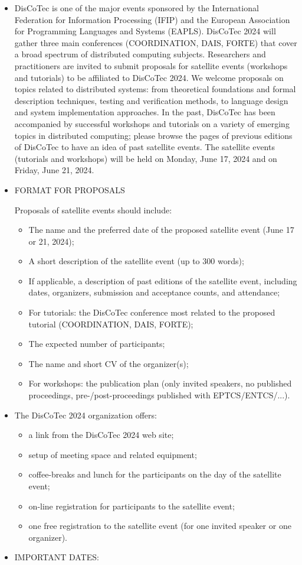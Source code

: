 \documentclass[prodmode,acmtecs]{acmsmall} %
\begin{document}
\begin{itemize}\item  DisCoTec is one of the major events sponsored by the International Federation for Information Processing (IFIP) and the European Association for Programming Languages and Systems (EAPLS). DisCoTec 2024 will gather three main conferences (COORDINATION, DAIS, FORTE) that cover a broad spectrum of distributed computing subjects. Researchers and practitioners are invited to submit proposals for satellite events (workshops and tutorials) to be affiliated to DisCoTec 2024. We welcome proposals on topics related to distributed systems: from theoretical foundations and formal description techniques, testing and verification methods, to language design and system implementation approaches. In the past, DisCoTec has been accompanied by successful workshops and tutorials on a variety of emerging topics in distributed computing; please browse the pages of previous editions of DisCoTec to have an idea of past satellite events. The satellite events (tutorials and workshops) will be held on Monday, June 17, 2024 and on Friday, June 21, 2024.  
 
\item  FORMAT FOR PROPOSALS 
 
  Proposals of satellite events should include: 
 
\begin{itemize}\item  The name and the preferred date of the proposed satellite event (June 17 or 21, 2024);
\item  A short description of the satellite event (up to 300 words);
\item  If applicable, a description of past editions of the satellite event, including dates, organizers, submission and acceptance counts, and attendance; 
\item  For tutorials: the DisCoTec conference most related to the proposed tutorial (COORDINATION, DAIS, FORTE);
\item  The expected number of participants;
\item  The name and short CV of the organizer(s);
\item  For workshops: the publication plan (only invited speakers, no published proceedings, pre-/post-proceedings published with EPTCS/ENTCS/...).
\end{itemize} 
\item  The DisCoTec 2024 organization offers: 
 
\begin{itemize}\item  a link from the DisCoTec 2024 web site;
\item  setup of meeting space and related equipment;
\item  coffee-breaks and lunch for the participants on the day of the satellite event;
\item  on-line registration for participants to the satellite event;
\item  one free registration to the satellite event (for one invited speaker or one organizer).
\end{itemize} 
\item  IMPORTANT DATES: 
 

\end{itemize}
\end{document}

